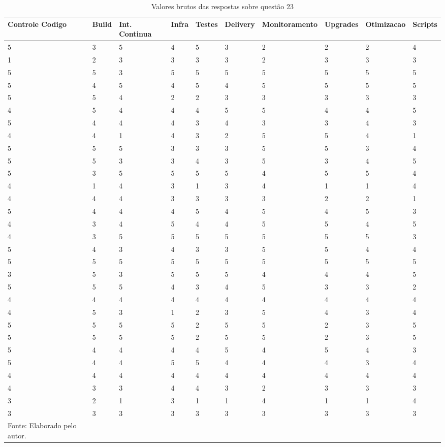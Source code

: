 \documentclass[twoside,english,brazilian]{UNISINOSartigo}
\newcommand{\source}[1]{\caption*{Fonte: {#1}} }
\begin{document}
{\begin{longtable}{llllllllll}
\caption{Valores brutos das respostas sobre questão 23}
\hline
Controle Codigo & Build & Int. Continua & Infra & Testes & Delivery & Monitoramento & Upgrades & Otimizacao & Scripts \\ \hline
\endfirsthead
%
\endhead
%
5 & 3 & 5 & 4 & 5 & 3 & 2 & 2 & 2 & 4 \\
1 & 2 & 3 & 3 & 3 & 3 & 2 & 3 & 3 & 3 \\
5 & 5 & 3 & 5 & 5 & 5 & 5 & 5 & 5 & 5 \\
5 & 4 & 5 & 4 & 5 & 4 & 5 & 5 & 5 & 5 \\
5 & 5 & 4 & 2 & 2 & 3 & 3 & 3 & 3 & 3 \\
4 & 5 & 4 & 4 & 4 & 5 & 5 & 4 & 4 & 5 \\
5 & 4 & 4 & 4 & 3 & 4 & 3 & 3 & 4 & 3 \\
4 & 4 & 1 & 4 & 3 & 2 & 5 & 5 & 4 & 1 \\
5 & 5 & 5 & 3 & 3 & 3 & 5 & 5 & 3 & 4 \\
5 & 5 & 3 & 3 & 4 & 3 & 5 & 3 & 4 & 5 \\
5 & 3 & 5 & 5 & 5 & 5 & 4 & 5 & 5 & 4 \\
4 & 1 & 4 & 3 & 1 & 3 & 4 & 1 & 1 & 4 \\
4 & 4 & 4 & 3 & 3 & 3 & 3 & 2 & 2 & 1 \\
5 & 4 & 4 & 4 & 5 & 4 & 5 & 4 & 5 & 3 \\
4 & 3 & 4 & 5 & 4 & 4 & 5 & 5 & 4 & 5 \\
4 & 3 & 5 & 5 & 5 & 5 & 5 & 5 & 5 & 3 \\
5 & 4 & 3 & 4 & 3 & 3 & 5 & 5 & 4 & 4 \\
5 & 5 & 5 & 5 & 5 & 5 & 5 & 5 & 5 & 5 \\
3 & 5 & 3 & 5 & 5 & 5 & 4 & 4 & 4 & 5 \\
5 & 5 & 5 & 4 & 3 & 4 & 5 & 3 & 3 & 2 \\
4 & 4 & 4 & 4 & 4 & 4 & 4 & 4 & 4 & 4 \\
4 & 5 & 3 & 1 & 2 & 3 & 5 & 4 & 3 & 4 \\
5 & 5 & 5 & 5 & 2 & 5 & 5 & 2 & 3 & 5 \\
5 & 5 & 5 & 5 & 2 & 5 & 5 & 2 & 3 & 5 \\
5 & 4 & 4 & 4 & 4 & 5 & 4 & 5 & 4 & 3 \\
5 & 4 & 4 & 5 & 5 & 4 & 4 & 4 & 3 & 4 \\
4 & 4 & 4 & 4 & 4 & 4 & 4 & 4 & 4 & 4 \\
4 & 3 & 3 & 4 & 4 & 3 & 2 & 3 & 3 & 3 \\
3 & 2 & 1 & 3 & 1 & 1 & 4 & 1 & 1 & 4 \\
3 & 3 & 3 & 3 & 3 & 3 & 3 & 3 & 3 & 3 \\
\hline
\source{Elaborado pelo autor.}
\end{longtable}}
\end{document}
